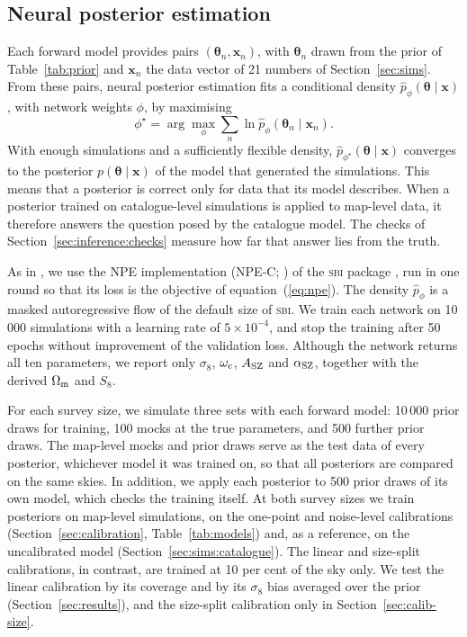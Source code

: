 \subsection{Neural posterior estimation}\label{sec:inference:npe}

Each forward model provides pairs $(\bm\theta_n,\bm x_n)$, with $\bm\theta_n$ drawn from the prior of
Table~\ref{tab:prior} and $\bm x_n$ the data vector of 21 numbers of Section~\ref{sec:sims}. From these
pairs, neural posterior estimation \citep{Papamakarios2016,Alsing2019,Cranmer2020} fits a conditional
density $\hat p_\phi(\bm\theta\mid\bm x)$, with network weights $\phi$, by maximising
\begin{equation}
\phi^\star = \arg\max_\phi\sum_n \ln \hat p_\phi(\bm\theta_n\mid\bm x_n).
\label{eq:npe}
\end{equation}
With enough simulations and a sufficiently flexible density, $\hat p_{\phi^\star}(\bm\theta\mid\bm x)$
converges to the posterior $p(\bm\theta\mid\bm x)$ of the model that generated the simulations. This
means that a posterior is correct only for data that its model describes. When a posterior trained on
catalogue-level simulations is applied to map-level data, it therefore answers the question posed by the catalogue model. The checks of Section~\ref{sec:inference:checks} measure how far that answer lies
from the truth.

As in \citet{Zubeldia2025}, we use the NPE implementation (NPE-C; \citealt{Greenberg2019}) of the
\textsc{sbi} package \citep[version 0.27;][]{Tejero2020}, run in one round so that its loss is the
objective of equation~(\ref{eq:npe}). The density $\hat p_\phi$ is a masked autoregressive flow
\citep{Papamakarios2017} of the default size of \textsc{sbi}. We train each network on 10\,000
simulations with a learning rate of $5\times10^{-4}$, and stop the training after 50 epochs without
improvement of the validation loss. Although the network returns all ten parameters, we report only
$\sigma_8$, $\omega_\mathrm{c}$, $A_\mathrm{SZ}$ and $\alpha_\mathrm{SZ}$, together with the derived $\Omega_\mathrm{m}$ and $S_8$.

For each survey size, we simulate three sets with each forward model: 10\,000 prior draws for training,
100 mocks at the true parameters, and 500 further prior draws. The map-level mocks and prior draws serve as
the test data of every posterior, whichever model it was trained on, so that all posteriors are compared on
the same skies. In addition, we apply each posterior to 500 prior draws of its own model, which checks the
training itself. At both survey sizes we train posteriors on map-level simulations, on the one-point and
noise-level calibrations (Section~\ref{sec:calibration}, Table~\ref{tab:models}) and, as a reference, on
the uncalibrated model (Section~\ref{sec:sims:catalogue}). The linear and size-split calibrations, in
contrast, are trained at 10 per cent of the sky only. We test the linear calibration by its coverage and by
its $\sigma_8$ bias averaged over the prior (Section~\ref{sec:results}), and the size-split calibration
only in Section~\ref{sec:calib-size}.

